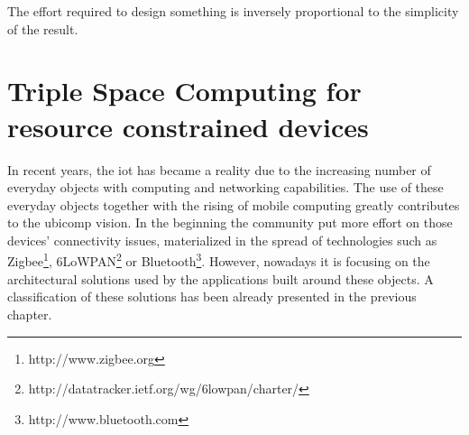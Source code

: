 

\begin{savequote}[50mm]
The effort required to design something is inversely proportional to the simplicity of the result.%
\end{savequote}


\newcommand{\codigo}[1]{``\texttt{#1}''}
\newcommand{\primquery}{\emph{query}}
\newcommand{\primread}{\emph{read}}
\newcommand{\primtake}{\emph{take}}
\newcommand{\primwrite}{\emph{write}}


\chapter{Triple Space Computing for resource constrained devices}
\label{cha:tsc}
\newcommand{\pathchapthree}{3_tsc}

\ifpdf
    \graphicspath{{\pathchapthree/figures/PNG/}{\pathchapthree/figures/PDF/}{\pathchapthree/figures/}}
\else
    \graphicspath{{\pathchapthree/figures/EPS/}{\pathchapthree/figures/}}
\fi





In recent years, the \acf{iot} has became a reality due to the increasing number of everyday objects with computing and networking capabilities.
The use of these everyday objects together with the rising of mobile computing greatly contributes to the \ac{ubicomp} vision.
In the beginning the community put more effort on those devices' connectivity issues, materialized in the spread of technologies such as Zigbee\footnote{http://www.zigbee.org}, 6LoWPAN\footnote{http://datatracker.ietf.org/wg/6lowpan/charter/} or Bluetooth\footnote{http://www.bluetooth.com}.
However, nowadays it is focusing on the architectural solutions used by the applications built around these objects.
A classification of these solutions has been already presented in the previous chapter. %


